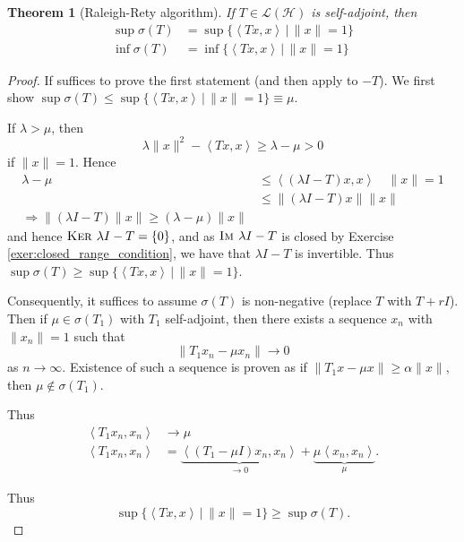 \documentclass[10pt, oneside, reqno]{amsart}
\theoremstyle{plain}%
\newtheorem{thm}{Theorem}[section]
\numberwithin{equation}{section}
\theoremstyle{definition}
\theoremstyle{remark}
\newcommand{\given}{ \, | \,}
\newcommand{\im}{\textsc{Im\ }}
\renewcommand{\ker}{\textsc{Ker\ }}
\newcommand{\iprod}[1]{\left\langle #1 \right\rangle}
\begin{document}
\begin{thm}[Raleigh-Rety algorithm]
    \label{thm:raleigh_rety}
    If $T \in \mathcal L(\mathcal H)$ is self-adjoint, then \begin{align*}
        \sup \sigma(T) &= \sup \{ \iprod{Tx, x} \given \| x \| = 1 \} \\
        \inf \sigma(T) &= \inf \{ \iprod{Tx, x} \given \| x \| = 1 \}
    \end{align*}
\end{thm}

\begin{proof}
    If suffices to prove the first statement (and then apply to $-T$).  We first show $\sup \sigma(T) \leq \sup \{ \iprod{Tx, x} \given \| x \| = 1 \} \equiv \mu$.    
    
    If $\lambda > \mu$, then \[
        \lambda \| x \|^2 - \iprod{Tx, x} \geq \lambda - \mu > 0
    \] if $\| x \| = 1$.  Hence \begin{align*}
        \lambda - \mu   &\leq \iprod{(\lambda I - T)x, x} \quad \| x \| = 1 \\
                        &\leq \| (\lambda I - T)x \| \| x \| \\
                    \Rightarrow \| (\lambda I - T)\| x \| \geq (\lambda - \mu) \| x \|
    \end{align*} and hence $\ker \lambda I - T = \{ 0 \}$, and as $\im \lambda I - T$ is closed by Exercise \ref{exer:closed_range_condition}, we have that $\lambda I - T$ is invertible.  Thus $\sup \sigma(T) \geq \sup \{ \iprod{Tx, x} \given \| x \| = 1 \}$. 
    
    Consequently, it suffices to assume $\sigma(T)$ is non-negative (replace $T$ with $T + rI$).  Then if $\mu \in \sigma(T_1)$ with $T_1$ self-adjoint, then there exists a sequence $x_n$ with $\| x_n \| = 1$ such that \[
        \| T_1 x_n - \mu x_n \| \rightarrow 0 
    \] as $n \rightarrow \infty$.  Existence of such a sequence is proven as if $\| T_1 x - \mu x \| \geq \alpha \| x \|$, then $\mu \notin \sigma(T_1)$.  
    
    Thus \begin{align*}
        \iprod{T_1 x_n, x_n} &\rightarrow \mu \\
        \iprod{T_1 x_n, x_n} &= \underbrace{\iprod{ (T_1 - \mu I) x_n, x_n}}_{\rightarrow 0} + \underbrace{\mu \iprod{x_n, x_n}}_{\mu}.
    \end{align*}
    
    Thus \[
        \sup \{ \iprod{Tx, x} \given \| x \| = 1\} \geq \sup \sigma(T).
    \]
\end{proof}
\end{document}
